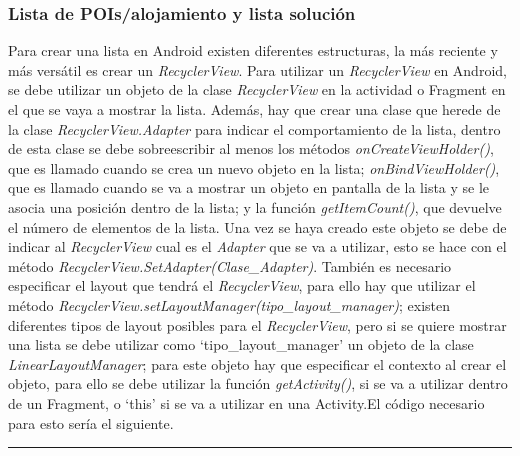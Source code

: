 \subsubsection{Lista de POIs/alojamiento y lista solución}
Para crear una lista en Android existen diferentes estructuras, la más reciente y más versátil es crear un \textit{RecyclerView}. Para utilizar un \textit{RecyclerView} en Android, se debe utilizar un objeto de la clase \textit{RecyclerView} en la actividad o Fragment en el que se vaya a mostrar la lista. Además, hay que crear una clase que herede de la clase \textit{RecyclerView.Adapter} para indicar el comportamiento de la lista, dentro de esta clase se debe sobreescribir al menos los métodos \textit{onCreateViewHolder()}, que es llamado cuando se crea un nuevo objeto en la lista; \textit{onBindViewHolder()}, que es llamado cuando se va a mostrar un objeto en pantalla de la lista y se le asocia una posición dentro de la lista; y la función \textit{getItemCount()}, que devuelve el número de elementos de la lista.\newline
Una vez se haya creado este objeto se debe de indicar al \textit{RecyclerView} cual es el \textit{Adapter} que se va a utilizar, esto se hace con el método \textit{RecyclerView.SetAdapter(Clase\_Adapter)}. También es necesario especificar el layout que tendrá el \textit{RecyclerView}, para ello hay que utilizar el método \textit{RecyclerView.setLayoutManager(tipo\_layout\_manager)}; existen diferentes tipos de layout posibles para el \textit{RecyclerView}, pero si se quiere mostrar una lista se debe utilizar como \enquote*{tipo\_layout\_manager} un objeto de la clase \textit{LinearLayoutManager}; para este objeto hay que especificar el contexto al crear el objeto, para ello se debe utilizar la función \textit{getActivity()}, si se va a utilizar dentro de un Fragment, o \enquote*{this} si se va a utilizar en una Activity.El código necesario para esto sería el siguiente.\newline
\noindent\rule[-1ex]{\textwidth}{1pt}\\
